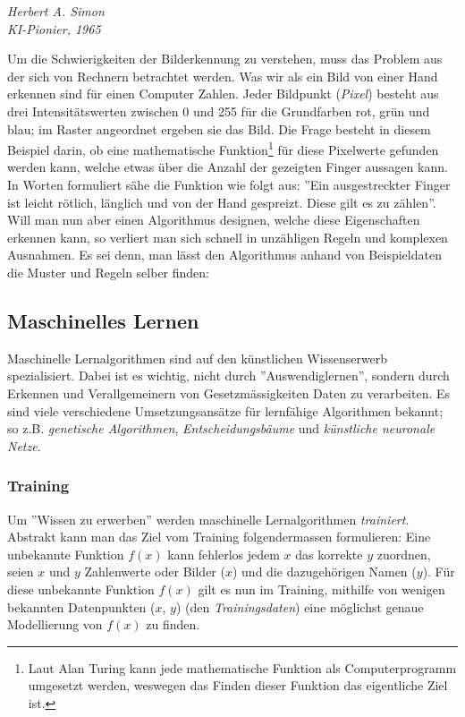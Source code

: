 \epigraph{\cite{hasimon}}{\textit{Herbert A. Simon\\ \textit{KI}-Pionier, 1965}}

Um die Schwierigkeiten der Bilderkennung zu verstehen, muss das Problem aus der sich von Rechnern betrachtet werden. Was wir als ein Bild von einer Hand erkennen sind für einen Computer Zahlen. Jeder Bildpunkt (\textit{Pixel}) besteht aus drei Intensitätswerten zwischen 0 und 255 für die Grundfarben rot, grün und blau; im Raster angeordnet ergeben sie das Bild. Die Frage besteht in diesem Beispiel darin, ob eine mathematische Funktion\footnote{Laut Alan Turing kann jede mathematische Funktion als Computerprogramm umgesetzt werden\cite{alanturing}, weswegen das Finden dieser Funktion das eigentliche Ziel ist.} für diese Pixelwerte gefunden werden kann, welche etwas über die Anzahl der gezeigten Finger aussagen kann. In Worten formuliert sähe die Funktion wie folgt aus: ''Ein ausgestreckter Finger ist leicht rötlich, länglich und von der Hand gespreizt. Diese gilt es zu zählen''. Will man nun aber einen Algorithmus designen, welche diese Eigenschaften erkennen kann, so verliert man sich schnell in unzähligen Regeln und komplexen Ausnahmen. Es sei denn, man lässt den Algorithmus anhand von Beispieldaten die Muster und Regeln selber finden:

\subsection{Maschinelles Lernen}\label{cha:theo:ml}
Maschinelle Lernalgorithmen sind auf den künstlichen Wissenserwerb spezialisiert. Dabei ist es wichtig, nicht durch ''Auswendiglernen'', sondern durch Erkennen und Verallgemeinern von Gesetzmässigkeiten Daten zu verarbeiten. Es sind viele verschiedene Umsetzungsansätze für lernfähige Algorithmen bekannt; so z.B. \textit{genetische Algorithmen}, \textit{Entscheidungsbäume} und \textit{künstliche neuronale Netze}.

\subsubsection{Training}\label{cha:theo:ml:training}
Um ''Wissen zu erwerben'' werden maschinelle Lernalgorithmen \textit{trainiert}. Abstrakt kann man das Ziel vom Training folgendermassen formulieren: Eine unbekannte Funktion $f(x)$ kann fehlerlos jedem $x$ das korrekte $y$ zuordnen, seien $x$ und $y$ Zahlenwerte oder Bilder ($x$) und die dazugehörigen Namen ($y$). Für diese unbekannte Funktion $f(x)$  gilt es nun im Training, mithilfe von wenigen bekannten Datenpunkten ($x$, $y$) (den \textit{Trainingsdaten}) eine möglichst genaue Modellierung von $f(x)$ zu finden.

